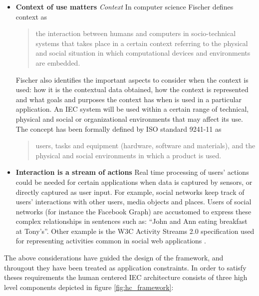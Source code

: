 \begin{itemize}
\item {\bf Context of use matters}
  \textit{Context} In computer science Fischer \cite{fischer2012context}
  defines context as
  \begin{quote}
  the interaction between humans and
  computers in socio-technical systems that takes place in a certain
  context referring to the physical and social situation in which
  computational devices and environments are embedded.
\end{quote}   
  Fischer also identifies the important aspects to consider when the context is used: how it is
  the contextual data obtained, how the context is represented and what
  goals and purposes the context has when is used in a particular
  application.   An IEC system will  be used within a certain range of technical, physical and social or
  organizational environments \cite{maguire2001context} that may affect its use.
  The concept has been formally defined
  by ISO standard 9241-11 \cite{international1998iso} as\begin{quote}
  users,
  tasks and equipment (hardware, software and materials), and the
  physical and social environments in which a product is used.
\end{quote}

\item {\bf Interaction is a stream of actions}
  Real time processing of users' actions could be needed for certain applications when data is 
  captured by sensors, or directly captured as user input. For example, social networks keep track of 
  users' interactions with other users, media objects and places. Users of 
  social networks (for instance the Facebook Graph) are accustomed to express these 
  complex relationships in sentences such as: ``John and Ann eating breakfast at Tony's''. 
  Other example is the W3C Activity Streams 2.0 specification used for representing activities 
  common in social web applications \cite{json:streams}. 
\end{itemize}

The above considerations have guided the design of the framework, and througout they have been
treated as application constraints. In order to satisfy theses requirements the
human centered IEC architecture consists of three high level components depicted
in figure \ref{fig:hc_framework}:

